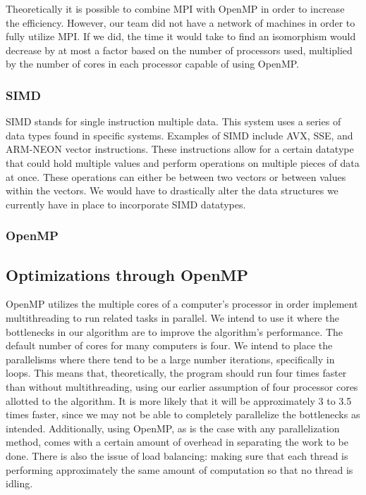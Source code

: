 \documentclass{article}
\begin{document}
    Theoretically it is possible to combine MPI with OpenMP in order to increase the efficiency. However, our team did not have a network of machines in order to fully utilize MPI. If we did, the time it would take to find an isomorphism would decrease by at most a factor based on the number of processors used, multiplied by the number of cores in each processor capable of using OpenMP.

    \subsubsection{SIMD}
    SIMD stands for single instruction multiple data. This system uses a series of data types found in specific systems. Examples of SIMD include AVX, SSE, and ARM-NEON vector instructions. These instructions allow for a certain datatype that could hold multiple values and perform operations on multiple pieces of data at once. These operations can either be between two vectors or between values within the vectors. We would have to drastically alter the data structures we currently have in place to incorporate SIMD datatypes.

    \subsubsection{OpenMP}

  \subsection{Optimizations through OpenMP}
  OpenMP utilizes the multiple cores of a computer's processor in order implement multithreading to run related tasks in parallel. We intend to use it where the bottlenecks in our algorithm are to improve the algorithm's performance. The default number of cores for many computers is four. We intend to place the parallelisms where there tend to be a large number iterations, specifically in loops. This means that, theoretically, the program should run four times faster than without multithreading, using our earlier assumption of four processor cores allotted to the algorithm. It is more likely that it will be approximately 3 to 3.5 times faster, since we may not be able to completely parallelize the bottlenecks as intended. Additionally, using OpenMP, as is the case with any parallelization method, comes with a certain amount of overhead in separating the work to be done. There is also the issue of load balancing: making sure that each thread is performing approximately the same amount of computation so that no thread is idling.
\end{document}
